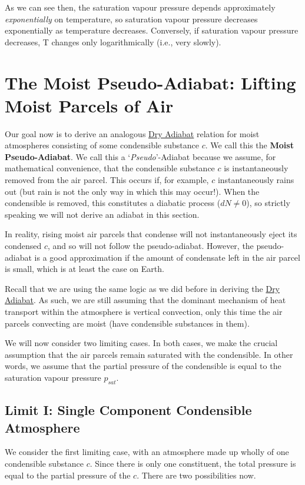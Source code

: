 As we can see then, the saturation vapour pressure depends approximately \textit{exponentially} on temperature, so saturation vapour pressure decreases exponentially as temperature decreases. Conversely, if saturation vapour pressure decreases, T changes only logarithmically (i.e., very slowly).

\section{The Moist Pseudo-Adiabat: Lifting Moist Parcels of Air}\label{Moist Pseudo Adiabat}

Our goal now is to derive an analogous \hyperref[Dry Adiabat]{Dry Adiabat} relation for moist atmospheres consisting of some condensible substance $c$. We call this the \textbf{Moist Pseudo-Adiabat}. We call this a `\textit{Pseudo}'-Adiabat because we assume, for mathematical convenience, that the condensible substance $c$ is instantaneously removed from the air parcel. This occurs if, for example, $c$ instantaneously rains out (but rain is not the only way in which this may occur!). When the condensible is removed, this constitutes a diabatic process ($dN\neq 0$), so strictly speaking we will not derive an adiabat in this section.

In reality, rising moist air parcels that condense will not instantaneously eject its condensed $c$, and so will not follow the pseudo-adiabat. However, the pseudo-adiabat is a good approximation if the amount of condensate left in the air parcel is small, which is at least the case on Earth.

Recall that we are using the same logic as we did before in deriving the \hyperref[Dry Adiabat]{Dry Adiabat}. As such, we are still assuming that the dominant mechanism of heat transport within the atmosphere is vertical convection, only this time the air parcels convecting are moist (have condensible substances in them). 

We will now consider two limiting cases. In both cases, we make the crucial assumption that the air parcels remain saturated with the condensible. In other words, we assume that the partial pressure of the condensible is equal to the saturation vapour pressure $p_{sat}$.

\subsection{Limit I: Single Component Condensible Atmosphere} 

We consider the first limiting case, with an atmosphere made up wholly of one condensible substance $c$. Since there is only one constituent, the total pressure is equal to the partial pressure of the $c$. There are two possibilities now.

